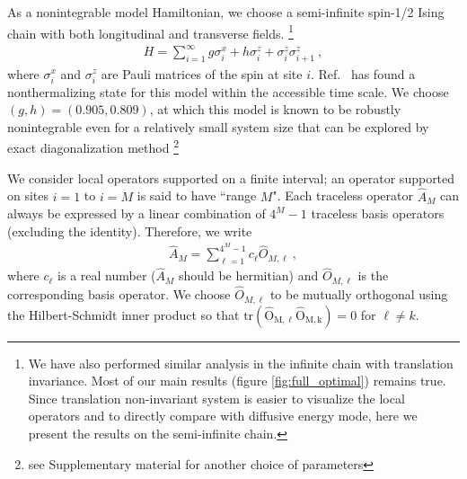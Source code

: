\documentclass[twocolumn,superscriptaddress, prb]{revtex4-1}
\begin{document}

As a nonintegrable model Hamiltonian, we choose a semi-infinite spin-1/2 Ising chain with both longitudinal and transverse fields.
\footnote{We have also performed similar analysis in the infinite chain with translation invariance. Most of our main results (figure \ref{fig:full_optimal})
remains true. Since translation non-invariant system is easier to visualize the local operators and to directly compare with diffusive energy mode, here we present the results on the semi-infinite chain.}
\begin{align}
H = \sum_{i=1}^{\infty} g\sigma^x_i + h\sigma^z_i + \sigma^z_i \sigma^z_{i+1} ~,
\label{eq:Hamiltonian}
\end{align}
where $\sigma^x_i$ and $\sigma^z_i$ are Pauli matrices of the spin at site $i$.
Ref.~ has found a nonthermalizing state for this model within the accessible time scale.
We choose $(g,h) = (0.905, 0.809)$, at which this model is known to be robustly nonintegrable even for a relatively small system size \cite{Kim:2013}
that can be explored by exact diagonalization method \footnote{see Supplementary material for another choice of parameters}

We consider local operators supported on a finite interval; an operator supported on sites $i=1$ to $i=M$ is said to have ``range $M$".
Each traceless operator
$\hat{A}_M$ can always be expressed by a linear combination of $4^M - 1$ traceless basis operators (excluding the identity).
Therefore, we write
\begin{align}
\hat{A}_M = \sum_{\ell = 1}^{4^M - 1} c_\ell \hat{O}_{M,\ell} ~,
\end{align}
where $c_\ell$ is a real number ($\hat{A}_M$ should be hermitian) and $\hat{O}_{M,\ell}$ is the corresponding basis operator.
We choose $\hat{O}_{M,\ell}$ to be mutually orthogonal using the Hilbert-Schmidt inner product so that
$\mathrm{tr(\hat{O}_{M,\ell} \hat{O}_{M,k})} = 0$ for $\ell\neq k$.
\end{document}
